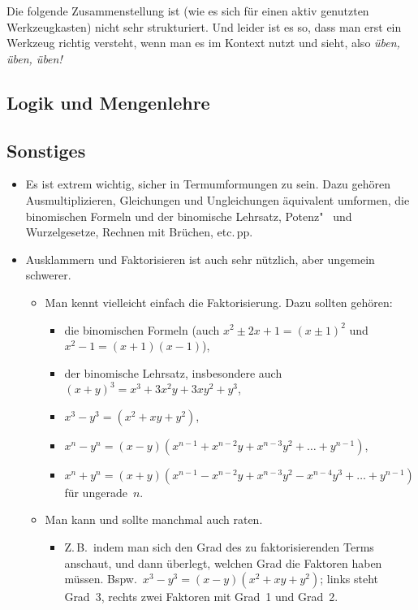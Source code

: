 \documentclass[a4paper]{article}
\begin{document}
Die folgende Zusammenstellung ist (wie es sich für einen aktiv genutzten Werkzeugkasten) nicht sehr strukturiert. Und leider ist es so, dass man erst ein Werkzeug richtig versteht, wenn man es im Kontext nutzt und sieht, also \emph{üben, üben, üben!}

\subsection{Logik und Mengenlehre}

\subsection{Sonstiges}

\begin{itemize}
    \item Es ist extrem wichtig, sicher in Termumformungen zu sein. Dazu gehören Ausmultiplizieren, Gleichungen und Ungleichungen äquivalent umformen, die binomischen Formeln und der binomische Lehrsatz, Potenz"~ und Wurzelgesetze, Rechnen mit Brüchen, etc.\,pp.
    \item Ausklammern und Faktorisieren ist auch sehr nützlich, aber ungemein schwerer.
          \begin{itemize}
              \item Man kennt vielleicht einfach die Faktorisierung. Dazu sollten gehören:
                    \begin{itemize}
                        \item die binomischen Formeln (auch $x^2 \pm 2x + 1 = (x \pm 1)^2$ und $x^2 - 1 = (x+1)(x-1)$),
                        \item der binomische Lehrsatz, insbesondere auch $(x + y)^3 = x^3 + 3x^2y + 3xy^2 + y^3$,
                        \item $x^3 - y^3 = (x^2 + xy + y^2)$,
                        \item $x^n - y^n = (x-y) (x^{n-1} + x^{n-2}y + x^{n-3}y^2 + \dots + y^{n-1})$,
                        \item $x^n + y^n = (x+y) (x^{n-1} - x^{n-2}y + x^{n-3}y^2 - x^{n-4}y^3 + \dots + y^{n-1})$ für ungerade~$n$.
                    \end{itemize}
              \item Man kann und sollte manchmal auch raten.
                    \begin{itemize}
                        \item Z.\,B.\ indem man sich den Grad des zu faktorisierenden Terms anschaut, und dann überlegt, welchen Grad die Faktoren haben müssen. Bspw.\ $x^3 - y^3 = (x - y) (x^2 + xy + y^2)$; links steht Grad~3, rechts zwei Faktoren mit Grad~1 und Grad~2.

\end{itemize}
\end{itemize}
\end{itemize}
\end{document}
